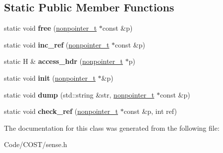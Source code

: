 \subsection*{Static Public Member Functions}
\begin{DoxyCompactItemize}
\item 
\mbox{\label{classpacket__trait_3_01smart__packet__t_3_01H_00_01P_01_4_01_5_4_a8203b63a40d444f739739f2b86a6b257}} 
static void {\bfseries free} (\hyperlink{classsmart__packet__t}{nonpointer\+\_\+t} $\ast$const \&p)
\item 
\mbox{\label{classpacket__trait_3_01smart__packet__t_3_01H_00_01P_01_4_01_5_4_a59c43d6712a4aa744743aaf6ed88d4af}} 
static void {\bfseries inc\+\_\+ref} (\hyperlink{classsmart__packet__t}{nonpointer\+\_\+t} $\ast$const \&p)
\item 
\mbox{\label{classpacket__trait_3_01smart__packet__t_3_01H_00_01P_01_4_01_5_4_adb153ce8750c5f29e71553b72730a74c}} 
static H \& {\bfseries access\+\_\+hdr} (\hyperlink{classsmart__packet__t}{nonpointer\+\_\+t} $\ast$p)
\item 
\mbox{\label{classpacket__trait_3_01smart__packet__t_3_01H_00_01P_01_4_01_5_4_abe52bd187f6662387a9634eb65e27dbe}} 
static void {\bfseries init} (\hyperlink{classsmart__packet__t}{nonpointer\+\_\+t} $\ast$\&p)
\item 
\mbox{\label{classpacket__trait_3_01smart__packet__t_3_01H_00_01P_01_4_01_5_4_acd1fa03336d8af2fd8f3e7cf29ed22ab}} 
static void {\bfseries dump} (std\+::string \&str, \hyperlink{classsmart__packet__t}{nonpointer\+\_\+t} $\ast$const \&p)
\item 
\mbox{\label{classpacket__trait_3_01smart__packet__t_3_01H_00_01P_01_4_01_5_4_a75eb913e12133bf526492ca75b5072b8}} 
static void {\bfseries check\+\_\+ref} (\hyperlink{classsmart__packet__t}{nonpointer\+\_\+t} $\ast$const \&p, int ref)
\end{DoxyCompactItemize}


The documentation for this class was generated from the following file\+:\begin{DoxyCompactItemize}
\item 
Code/\+C\+O\+S\+T/sense.\+h\end{DoxyCompactItemize}
